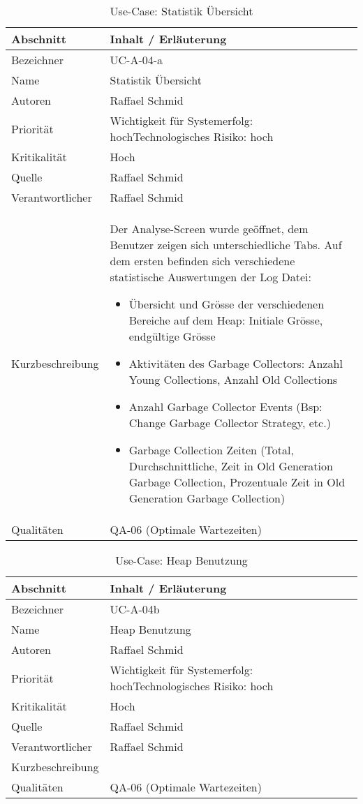 \begin{longtable}{|p{4cm}|p{10.5cm}|}
\caption{Use-Case: Statistik Übersicht}\\\hline
   \textbf{Abschnitt} & \textbf{Inhalt / Erläuterung} \\\hline
   Bezeichner & UC-A-04-a\\\hline
   Name & Statistik Übersicht\\\hline
   Autoren & Raffael Schmid\\\hline
   Priorität & Wichtigkeit für Systemerfolg: hoch\newline Technologisches Risiko: hoch\\\hline
   Kritikalität & Hoch\\\hline
   Quelle & Raffael Schmid\\\hline
   Verantwortlicher & Raffael Schmid\\\hline
   Kurzbeschreibung & Der Analyse-Screen wurde geöffnet, dem Benutzer zeigen sich unterschiedliche Tabs. Auf dem ersten befinden sich verschiedene statistische Auswertungen der Log Datei:
   \begin{itemize}
	\item Übersicht und Grösse der verschiedenen Bereiche auf dem Heap: Initiale Grösse, endgültige Grösse
	\item Aktivitäten des Garbage Collectors: Anzahl Young Collections, Anzahl Old Collections
	\item Anzahl Garbage Collector Events (Bsp: Change Garbage Collector Strategy, etc.)
	\item Garbage Collection Zeiten (Total, Durchschnittliche, Zeit in Old Generation Garbage Collection, Prozentuale Zeit in Old Generation Garbage Collection)
   \end{itemize}
 \\\hline
   Qualitäten & QA-06 (Optimale Wartezeiten)\\\hline
\end{longtable}

\begin{longtable}{|p{4cm}|p{10.5cm}|}
\caption{Use-Case: Heap Benutzung}\\\hline
   \textbf{Abschnitt} & \textbf{Inhalt / Erläuterung} \\\hline
   Bezeichner & UC-A-04b\\\hline
   Name & Heap Benutzung\\\hline
   Autoren & Raffael Schmid\\\hline
   Priorität & Wichtigkeit für Systemerfolg: hoch\newline Technologisches Risiko: hoch\\\hline
   Kritikalität & Hoch\\\hline
   Quelle & Raffael Schmid\\\hline
   Verantwortlicher & Raffael Schmid\\\hline
   Kurzbeschreibung & \\\hline
   Qualitäten & QA-06 (Optimale Wartezeiten)\\\hline
\end{longtable}

